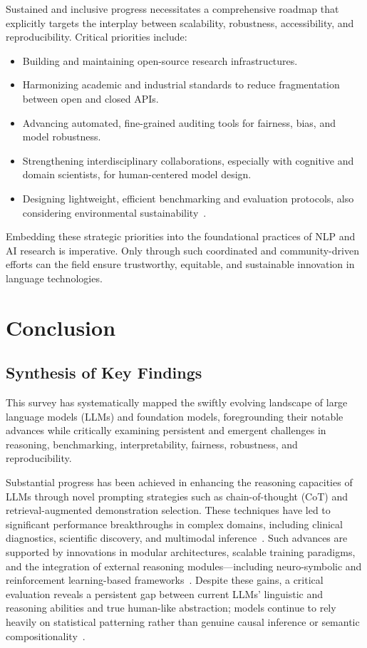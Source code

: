 \documentclass[sigconf]{acmart}
\begin{document}
Sustained and inclusive progress necessitates a comprehensive roadmap that explicitly targets the interplay between scalability, robustness, accessibility, and reproducibility. Critical priorities include:

\begin{itemize}
    \item Building and maintaining open-source research infrastructures.
    \item Harmonizing academic and industrial standards to reduce fragmentation between open and closed APIs.
    \item Advancing automated, fine-grained auditing tools for fairness, bias, and model robustness.
    \item Strengthening interdisciplinary collaborations, especially with cognitive and domain scientists, for human-centered model design.
    \item Designing lightweight, efficient benchmarking and evaluation protocols, also considering environmental sustainability~\cite{ref13,ref34,ref46,ref47,ref55,ref66,ref68,ref70,ref71,ref88,ref101,ref104,ref106,ref107,ref108}.
\end{itemize}

Embedding these strategic priorities into the foundational practices of NLP and AI research is imperative. Only through such coordinated and community-driven efforts can the field ensure trustworthy, equitable, and sustainable innovation in language technologies.

\section{Conclusion}

\subsection{Synthesis of Key Findings}

This survey has systematically mapped the swiftly evolving landscape of large language models (LLMs) and foundation models, foregrounding their notable advances while critically examining persistent and emergent challenges in reasoning, benchmarking, interpretability, fairness, robustness, and reproducibility.

Substantial progress has been achieved in enhancing the reasoning capacities of LLMs through novel prompting strategies such as chain-of-thought (CoT) and retrieval-augmented demonstration selection. These techniques have led to significant performance breakthroughs in complex domains, including clinical diagnostics, scientific discovery, and multimodal inference~\cite{ref23,ref38,ref47,ref58,ref61,ref78,ref86}. Such advances are supported by innovations in modular architectures, scalable training paradigms, and the integration of external reasoning modules—including neuro-symbolic and reinforcement learning-based frameworks~\cite{ref49,ref52,ref57,ref86,ref87,ref89}. Despite these gains, a critical evaluation reveals a persistent gap between current LLMs' linguistic and reasoning abilities and true human-like abstraction; models continue to rely heavily on statistical patterning rather than genuine causal inference or semantic compositionality~\cite{ref23,ref49,ref57}.
\end{document}

